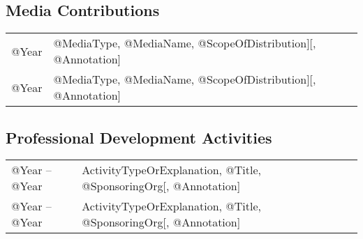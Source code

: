 \documentclass[10pt]{article}
\begin{document}
\begin{IOWA ONLY}
\subsection*{Media Contributions}

\begin{tabular}{l@{\quad\ }p{34em}} 
 @Year  & @MediaType, @MediaName, @ScopeOfDistribution][, @Annotation]
 \\[.5ex]
 @Year  & @MediaType, @MediaName, @ScopeOfDistribution][, @Annotation]
\end{tabular}

\subsection*{Professional Development Activities}

\begin{tabular}{l@{\quad\ }p{34em}} 
 @Year -- @Year 
 & ActivityTypeOrExplanation, @Title, @SponsoringOrg[, @Annotation]
 \\[.5ex]
 @Year -- @Year 
 & ActivityTypeOrExplanation, @Title, @SponsoringOrg[, @Annotation]
\end{tabular}

\end{IOWA ONLY}
\end{document}
